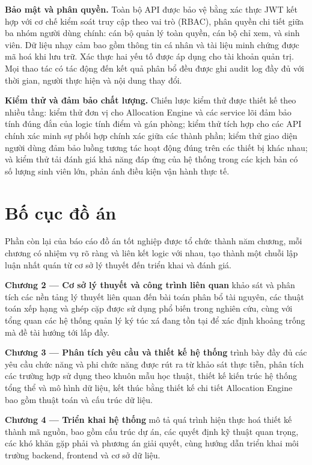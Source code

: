 ﻿\documentclass[a4paper,12pt,openany,oneside]{report}
\begin{document}
\textbf{Bảo mật và phân quyền.} Toàn bộ API được bảo vệ bằng xác thực JWT kết
hợp với cơ chế kiểm soát truy cập theo vai trò (RBAC), phân quyền chi tiết giữa
ba nhóm người dùng chính: cán bộ quản lý toàn quyền, cán bộ chỉ xem, và sinh
viên. Dữ liệu nhạy cảm bao gồm thông tin cá nhân và tài liệu minh chứng được
mã hoá khi lưu trữ. Xác thực hai yếu tố được áp dụng cho tài khoản quản trị.
Mọi thao tác có tác động đến kết quả phân bổ đều được ghi audit log đầy đủ với
thời gian, người thực hiện và nội dung thay đổi.

\textbf{Kiểm thử và đảm bảo chất lượng.} Chiến lược kiểm thử được thiết kế
theo nhiều tầng: kiểm thử đơn vị cho Allocation Engine và các service lõi đảm
bảo tính đúng đắn của logic tính điểm và gán phòng; kiểm thử tích hợp cho các
API chính xác minh sự phối hợp chính xác giữa các thành phần; kiểm thử giao
diện người dùng đảm bảo luồng tương tác hoạt động đúng trên các thiết bị khác
nhau; và kiểm thử tải đánh giá khả năng đáp ứng của hệ thống trong các kịch bản
có số lượng sinh viên lớn, phản ánh điều kiện vận hành thực tế.

\section{Bố cục đồ án}

Phần còn lại của báo cáo đồ án tốt nghiệp được tổ chức thành năm chương, mỗi
chương có nhiệm vụ rõ ràng và liên kết logic với nhau, tạo thành một chuỗi lập
luận nhất quán từ cơ sở lý thuyết đến triển khai và đánh giá.

\textbf{Chương 2 --- Cơ sở lý thuyết và công trình liên quan} khảo sát và phân
tích các nền tảng lý thuyết liên quan đến bài toán phân bổ tài nguyên, các
thuật toán xếp hạng và ghép cặp được sử dụng phổ biến trong nghiên cứu, cùng
với tổng quan các hệ thống quản lý ký túc xá đang tồn tại để xác định khoảng
trống mà đề tài hướng tới lấp đầy.

\textbf{Chương 3 --- Phân tích yêu cầu và thiết kế hệ thống} trình bày đầy đủ
các yêu cầu chức năng và phi chức năng được rút ra từ khảo sát thực tiễn, phân
tích các trường hợp sử dụng theo khuôn mẫu học thuật, thiết kế kiến trúc hệ
thống tổng thể và mô hình dữ liệu, kết thúc bằng thiết kế chi tiết Allocation
Engine bao gồm thuật toán và cấu trúc dữ liệu.

\textbf{Chương 4 --- Triển khai hệ thống} mô tả quá trình hiện thực hoá thiết
kế thành mã nguồn, bao gồm cấu trúc dự án, các quyết định kỹ thuật quan trọng,
các khó khăn gặp phải và phương án giải quyết, cùng hướng dẫn triển khai môi
trường backend, frontend và cơ sở dữ liệu.
\end{document}
